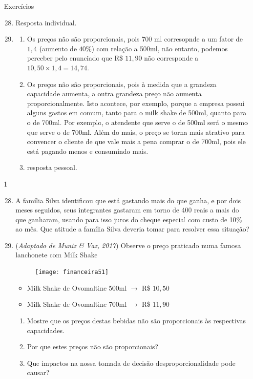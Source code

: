 \begin{resposta}{Exercícios}
{
  \begin{enumerate}\setcounter{enumi}{27}
    \item Resposta individual.
    \item
    \begin{enumerate}
      \item Os preços não são proporcionais, pois 700 ml corresopnde a um fator de $1{,}4$ (aumento de $40$\%) com relação a 500ml, não entanto, podemos perceber pelo enunciado que R\$ $11{,}90$ não corresponde a $10{,}50\times1{,}4=14{,}74$.
      \item Os preços não são proporcionais, pois à medida que a grandeza capacidade aumenta, a outra grandeza preço não aumenta proporcionalmente. Isto acontece, por exemplo, porque a empresa possui alguns gastos em comum, tanto para o milk shake de 500ml, quanto para o de 700ml. Por exemplo, o atendente que serve o de 500ml será o mesmo que serve o de 700ml. Além do mais, o preço se torna mais atrativo para convencer o cliente de que vale mais a pena comprar o de 700ml, pois ele está pagando menos e consumindo mais.
      \item resposta pessoal.
    \end{enumerate}
  \end{enumerate}  
}{1}
\end{resposta}

\begin{enumerate}\setcounter{enumi}{27}
\item A família Silva identificou que está gastando mais do que ganha, e por dois meses seguidos, seus integrantes gastaram em torno de 400 reais a mais do que ganharam, usando para isso juros do cheque especial com custo de 10\% ao mês. Que atitude a família Silva deveria tomar para resolver essa situação? 

\item (\textit{Adaptado de Muniz \& Vaz, 2017}) Observe o preço praticado numa famosa lanchonete com Milk Shake

\begin{figure}[H]
\centering

\texttt{[image: financeira51]}
\end{figure}

\begin{itemize}
  \item Milk Shake de Ovomaltine 500ml $\rightarrow$ R\$ $10{,}50$
  \item Milk Shake de Ovomaltine 700ml $\rightarrow$ R\$ $11{,}90$
\end{itemize}

\begin{enumerate}
  \item Mostre que os preços destas bebidas não são proporcionais às respectivas capacidades.
  \item Por que estes preços não são proporcionais?
  \item Que impactos na nossa tomada de decisão desproporcionalidade pode causar?
\end{enumerate}


\end{enumerate}


